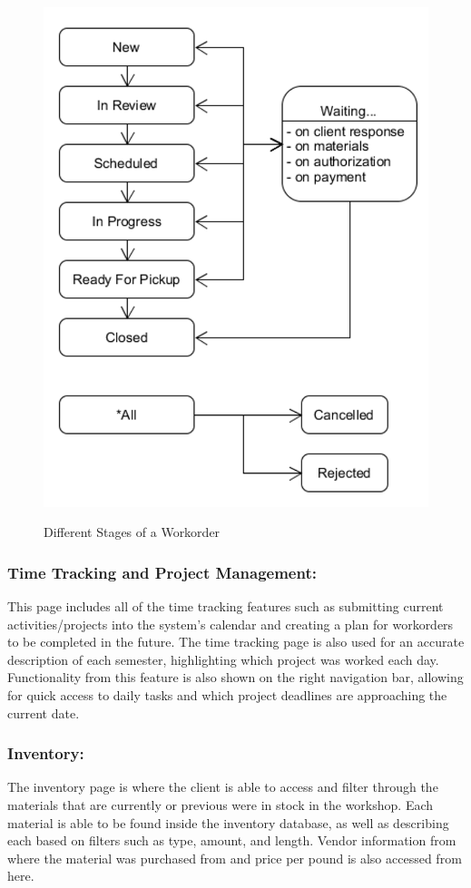{\begin{figure}[h]
	\centering
	\includegraphics[width=5in]{workorder-status.png}\\
	\caption{Different Stages of a Workorder}
	\label{fig:tobias}
\end{figure}

\subsubsection{Time Tracking and Project Management:}
This page includes all of the time tracking features such as submitting current activities/projects into the system's calendar and creating a plan for workorders to be completed in the future. The time tracking page is also used for an accurate description of each semester, highlighting which project was worked each day. Functionality from this feature is also shown on the right navigation bar, allowing for quick access to daily tasks and which project deadlines are approaching the current date.

\subsubsection{Inventory:}
The inventory page is where the client is able to access and filter through the materials that are currently or previous were in stock in the workshop. Each material is able to be found inside the inventory database, as well as describing each based on filters such as type, amount, and length. Vendor information from where the material was purchased from and price per pound is also accessed from here. 

}
